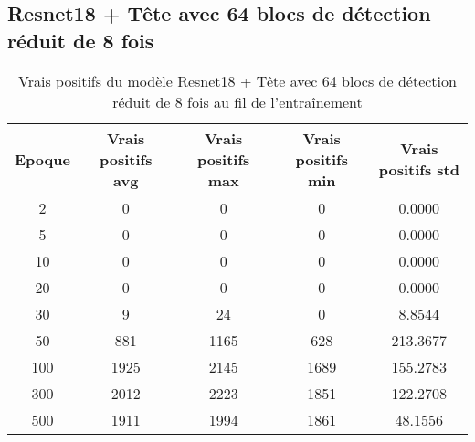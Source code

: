 
\clearpage
\subsection{Resnet18 + Tête avec 64 blocs de détection réduit de 8 fois}

\begin{table}[!ht]
    \caption{Vrais positifs du modèle Resnet18 + Tête avec 64 blocs de détection réduit de 8 fois au fil de l'entraînement}
    \label{tab:resnet18+head_64n_true_positive_reduced_8x_precision}
    \centering
    \begin{tabular}{ |c||c|c|c|c|  }
        \hline
        \rowcolor{gray!50}
        Epoque & Vrais positifs avg & Vrais positifs max & Vrais positifs min & Vrais positifs std\\
        \hline
        2 & 0 & 0 & 0 & 0.0000\\
        5 & 0 & 0 & 0 & 0.0000\\
        10 & 0 & 0 & 0 & 0.0000\\
        20 & 0 & 0 & 0 & 0.0000\\
        30 & 9 & 24 & 0 & 8.8544\\
        50 & 881 & 1165 & 628 & 213.3677\\
        100 & 1925 & 2145 & 1689 & 155.2783\\
        300 & 2012 & 2223 & 1851 & 122.2708\\
        500 & 1911 & 1994 & 1861 & 48.1556\\
        \hline
    \end{tabular}
\end{table}

